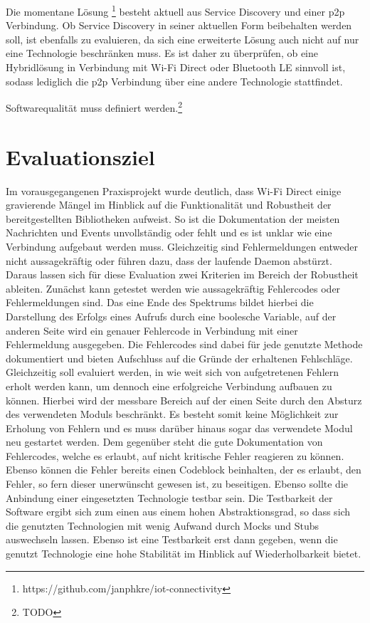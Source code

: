 \documentclass[12pt,a4paper]{article}
\begin{document}
        Die momentane Lösung \footnote{https://github.com/janphkre/iot-connectivity} besteht aktuell aus Service Discovery und einer p2p Verbindung. Ob Service Discovery in seiner aktuellen Form beibehalten werden soll, ist ebenfalls zu evaluieren, da sich eine erweiterte Lösung auch nicht auf nur eine Technologie beschränken muss. Es ist daher zu überprüfen, ob eine Hybridlösung in Verbindung mit Wi-Fi Direct oder Bluetooth LE sinnvoll ist, sodass lediglich die p2p Verbindung über eine andere Technologie stattfindet.

		Softwarequalität muss definiert werden.\footnote{TODO}
        
	\section{Evaluationsziel}	
	
        Im vorausgegangenen Praxisprojekt wurde deutlich, dass Wi-Fi Direct einige gravierende Mängel im Hinblick auf die Funktionalität und Robustheit der bereitgestellten Bibliotheken aufweist. So ist die Dokumentation der meisten Nachrichten und Events unvollständig oder fehlt und es ist unklar wie eine Verbindung aufgebaut werden muss. Gleichzeitig sind Fehlermeldungen entweder nicht aussagekräftig oder führen dazu, dass der laufende Daemon abstürzt.
        Daraus lassen sich für diese Evaluation zwei Kriterien im Bereich der Robustheit ableiten.
        Zunächst kann getestet werden wie aussagekräftig Fehlercodes oder Fehlermeldungen sind.
        Das eine Ende des Spektrums bildet hierbei die Darstellung des Erfolgs eines Aufrufs durch eine boolesche Variable, auf der anderen Seite wird ein genauer Fehlercode in Verbindung mit einer Fehlermeldung ausgegeben. Die Fehlercodes sind dabei für jede genutzte Methode dokumentiert und bieten Aufschluss auf die Gründe der erhaltenen Fehlschläge. 
        Gleichzeitig soll evaluiert werden, in wie weit sich von aufgetretenen Fehlern erholt werden kann, um dennoch eine erfolgreiche Verbindung aufbauen zu können. Hierbei wird der messbare Bereich auf der einen Seite durch den Absturz des verwendeten Moduls beschränkt. Es besteht somit keine Möglichkeit zur Erholung von Fehlern und es muss darüber hinaus sogar das verwendete Modul neu gestartet werden. Dem gegenüber steht die gute Dokumentation von Fehlercodes, welche es erlaubt, auf nicht kritische Fehler reagieren zu können. Ebenso können die Fehler bereits einen Codeblock beinhalten, der es erlaubt, den Fehler, so fern dieser unerwünscht gewesen ist, zu beseitigen.
        Ebenso sollte die Anbindung einer eingesetzten Technologie testbar sein. Die Testbarkeit der Software ergibt sich zum einen aus einem hohen Abstraktionsgrad, so dass sich die genutzten Technologien mit wenig Aufwand durch Mocks und Stubs auswechseln lassen. Ebenso ist eine Testbarkeit erst dann gegeben, wenn die genutzt Technologie eine hohe Stabilität im Hinblick auf Wiederholbarkeit bietet.
        
\end{document}
